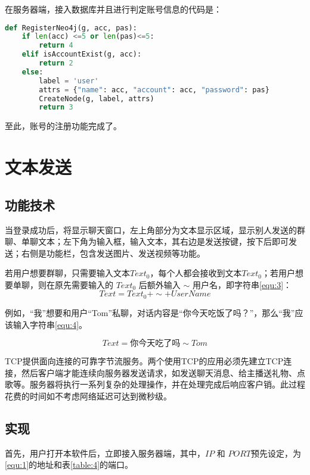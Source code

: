 \documentclass[forprint]{sql}
\begin{document}
在服务器端，接入数据库并且进行判定账号信息的代码是：

\begin{lstlisting}[language=Python]
def RegisterNeo4j(g, acc, pas):
	if len(acc) <=5 or len(pas)<=5:
		return 4
	elif isAccountExist(g, acc):
		return 2
	else:
		label = 'user'
		attrs = {"name": acc, "account": acc, "password": pas}
		CreateNode(g, label, attrs)
		return 3
\end{lstlisting} 

至此，账号的注册功能完成了。

\section{文本发送}

\subsection{功能技术}

当登录成功后，将显示聊天窗口，左上角部分为文本显示区域，显示别人发送的群聊、单聊文本；左下角为输入框，输入文本，其右边是发送按键，按下后即可发送；右侧是功能栏，包含发送图片、发送视频等功能。

若用户想要群聊，只需要输入文本$Text_0$，每个人都会接收到文本$Text_0$；若用户想要单聊，则在原先需要输入的 $Text_0$ 后额外输入 $ \sim $  用户名，即字符串\ref{equ:3}：
\begin{equation}
	\label{equ:3}
	Text = Text_0 + \sim + UserName
\end{equation} 

例如，“我”想要和用户“Tom”私聊，对话内容是“你今天吃饭了吗？”，那么“我”应该输入字符串\ref{equ:4}。

\begin{equation}
	\label{equ:4}
	Text = \mbox{你今天吃了吗} \sim Tom
\end{equation} 

TCP提供面向连接的可靠字节流服务。两个使用TCP的应用必须先建立TCP连接，然后客户端才能连续向服务器发送请求，如发送聊天消息、给主播送礼物、点歌等。服务器将执行一系列复杂的处理操作，并在处理完成后响应客户销。此过程花费的时间如不考虑阿络延迟可达到微秒级。
\subsection{实现}

首先，用户打开本软件后，立即接入服务器端，其中，$IP$ 和 $PORT$预先设定，为\ref{equ:1}的地址和表\ref{table:4}的端口。
\end{document}
